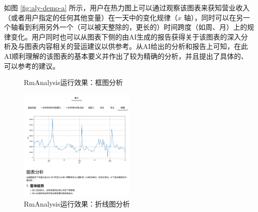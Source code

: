 如图 \ref{fig:aly-demo-a} 所示，用户在热力图上可以通过观察该图表来获知营业收入（或者用户指定的任何其他变量）在一天中的变化规律（$x$ 轴），同时可以在另一个轴看到利用另外一个（可以被天整除的，更长的）时间跨度（如周、月）上的规律变化。用户同时也可以从图表下侧的由AI生成的报告获得关于该图表的深入分析及与图表内容相关的营运建议以供参考。从AI给出的分析和报告上可知，在此AI顺利理解的该图表的基本要义并作出了较为精确的分析，并且提出了具体的、可以参考的建议。

\begin{figure}[htbp]
    \centering
	\caption{RmAnalysis运行效果：框图分析}
	\label{fig:aly-demo-b}
\end{figure}

\begin{figure}[htbp]
	\centering
	\includegraphics[width=0.5\textwidth]{./exp/aly-demo-5.png}
	\caption{RmAnalysis运行效果：折线图分析}
	\label{fig:aly-demo-5}
\end{figure}

